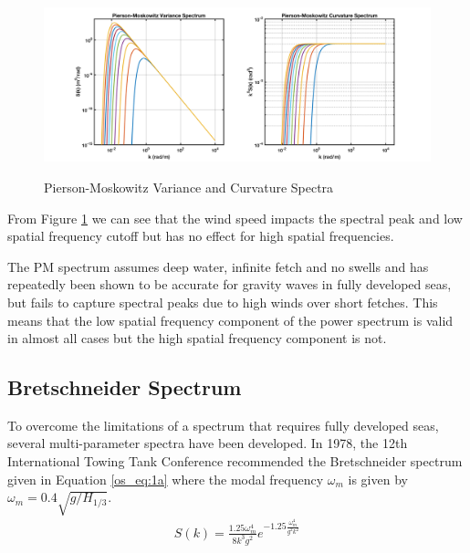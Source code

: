  \begin{figure}[H]
  \begin{center}
\includegraphics[width=6in]{../media/Ocean_Surface/PM_variance_curvature_spectrum.png}
  \end{center}
  \renewcommand{\baselinestretch}{1} \small\normalsize
  \begin{quote}
    \caption[Pierson-Moskowitz Variance and Curvature Spectra]{Pierson-Moskowitz Variance and Curvature Spectra\label{os_fig:1}}
  \end{quote}
\end{figure}
 \renewcommand{\baselinestretch}{2} \small\normalsize
 
 From Figure \ref{os_fig:1} we can see that the wind speed impacts the spectral peak and low spatial frequency cutoff but has no effect for high spatial frequencies.
 
The PM spectrum assumes deep water, infinite fetch and no swells and has repeatedly been shown to be accurate for gravity waves in fully developed seas, but fails to capture spectral peaks due to high winds over short fetches. This means that the low spatial frequency component of the power spectrum is valid in almost all cases but the high spatial frequency component is not.

\subsection{Bretschneider Spectrum}
To overcome the limitations of a spectrum that requires fully developed seas, several multi-parameter spectra have been developed. In 1978, the 12th International Towing Tank Conference recommended the Bretschneider spectrum \cite{michel_sea_spectra} given in Equation \ref{os_eq:1a} where the modal frequency $\omega_m$ is given by $\omega_m = 0.4\sqrt{g/H_{1/3}}$.
\begin{equation}
  \begin{gathered}
  \label{os_eq:1a}
  S(k) = \frac{1.25 \omega_m^4}{8k^3g^2}e^{-1.25\frac{\omega_m^4}{g^2k^2}} 
  \end{gathered}
\end{equation}
\renewcommand{\baselinestretch}{2} \small\normalsize

